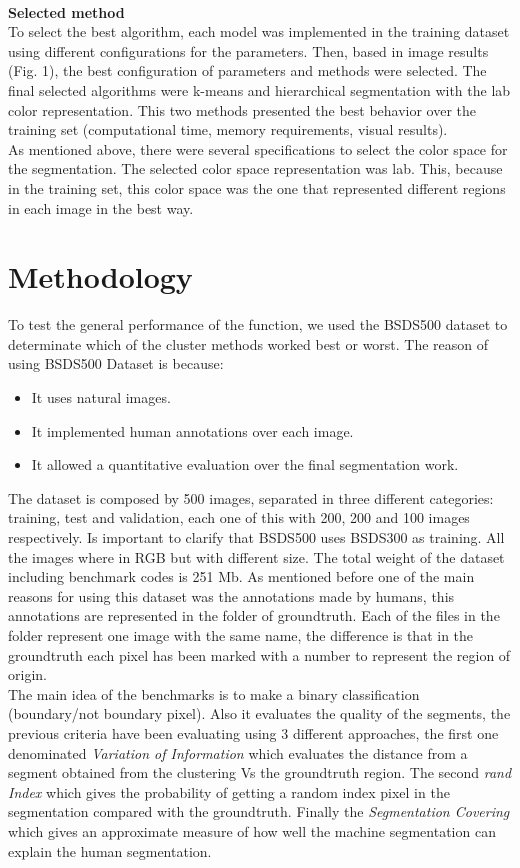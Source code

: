 \documentclass[10pt,twocolumn,letterpaper]{article}
\begin{document}
\\
\textbf{Selected method}\\
\indent To select the best algorithm, each model was implemented in the training dataset using different configurations for the parameters. Then, based in image results (Fig. 1), the best configuration of parameters and methods were selected. The final selected algorithms were k-means and hierarchical segmentation with the lab color representation. This two methods presented the best behavior over the training set (computational time, memory requirements, visual results).\\
\indent As mentioned above, there were several specifications to select the color space for the segmentation. The selected color space representation was lab. This, because in the training set, this color space was the one that represented different regions in each image in the best way.\\

\section{Methodology}
To test the general performance of the function, we used the BSDS500 dataset to determinate which of the cluster methods worked best or worst.
The reason of using BSDS500 Dataset is because:
\begin{itemize}
\item It uses natural images.
\item It implemented human annotations over each image.
\item It allowed a quantitative evaluation over the final segmentation work.
\end{itemize}
\indent The dataset is composed by 500 images, separated in three different categories: training, test and validation, each one of this with 200, 200 and 100 images respectively. Is important to clarify that BSDS500 uses BSDS300 as training. All the images where in RGB but with different size. The total weight of the dataset including benchmark codes is 251 Mb.
As mentioned before one of the main reasons for using this dataset was the annotations made by humans, this annotations are represented in the folder of groundtruth. Each of the files in the folder represent one image with the same name, the difference is that in the groundtruth each pixel has been marked with a number to represent the region of origin.\\
\indent The main idea of the benchmarks is to make a binary classification (boundary/not boundary pixel). Also it evaluates the quality of the segments, the previous criteria have been evaluating using 3 different approaches, the first one denominated \textit{Variation of Information} which evaluates the distance from a segment obtained from the clustering Vs the groundtruth region. The second \textit{rand Index} which gives the probability of getting a random index pixel in the segmentation compared with the groundtruth. Finally the \textit{Segmentation Covering} which gives an approximate measure of how well the machine segmentation can explain the human segmentation.
\end{document}
